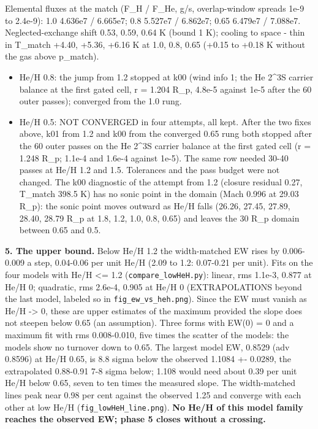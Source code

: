 \documentclass[english,a4paper]{my_memo}
\providecommand{\tightlist}{\setlength{\itemsep}{0pt}\setlength{\parskip}{0pt}}
\begin{document}
Elemental fluxes at the match (F\_H / F\_He, g/s, overlap-window spreads
1e-9 to 2.4e-9): 1.0 4.636e7 / 6.665e7; 0.8 5.527e7 / 6.862e7; 0.65
6.479e7 / 7.088e7. Neglected-exchange shift 0.53, 0.59, 0.64 K (bound 1 K);
cooling to space - thin in T\_match +4.40, +5.36, +6.16 K at 1.0, 0.8,
0.65 (+0.15 to +0.18 K without the gas above p\_match).

\begin{itemize}
\tightlist
\item
  He/H 0.8: the jump from 1.2 stopped at k00 (wind info 1; the He 2\^{}3S
  carrier balance at the first gated cell, r = 1.204 R\_p, 4.8e-5 against
  1e-5 after the 60 outer passes); converged from the 1.0 rung.
\item
  He/H 0.5: NOT CONVERGED in four attempts, all kept. After the two fixes
  above, k01 from 1.2 and k00 from the converged 0.65 rung both stopped
  after the 60 outer passes on the He 2\^{}3S carrier balance at the first
  gated cell (r = 1.248 R\_p; 1.1e-4 and 1.6e-4 against 1e-5). The same row
  needed 30-40 passes at He/H 1.2 and 1.5. Tolerances and the pass budget
  were not changed. The k00 diagnostic of the attempt from 1.2 (closure
  residual 0.27, T\_match 398.5 K) has no sonic point in the domain (Mach
  0.996 at 29.03 R\_p): the sonic point moves outward as He/H falls (26.26,
  27.45, 27.89, 28.40, 28.79 R\_p at 1.8, 1.2, 1.0, 0.8, 0.65) and leaves
  the 30 R\_p domain between 0.65 and 0.5.
\end{itemize}

\textbf{5. The upper bound.} Below He/H 1.2 the width-matched EW rises by
0.006-0.009 a step, 0.04-0.06 per unit He/H (2.09 to 1.2: 0.07-0.21 per
unit). Fits on the four models with He/H \textless= 1.2 (\texttt{compare\_lowHeH.py}):
linear, rms 1.1e-3, 0.877 at He/H 0; quadratic, rms 2.6e-4, 0.905 at He/H
0 (EXTRAPOLATIONS beyond the last model, labeled so in
\texttt{fig\_ew\_vs\_heh.png}). Since the EW must vanish as He/H -\textgreater{} 0, these are
upper estimates of the maximum provided the slope does not steepen below
0.65 (an assumption). Three forms with EW(0) = 0 and a maximum fit with rms
0.008-0.010, five times the scatter of the models: the models show no
turnover down to 0.65. The largest model EW, 0.8529 (adv 0.8596) at He/H
0.65, is 8.8 sigma below the observed 1.1084 +- 0.0289, the extrapolated
0.88-0.91 7-8 sigma below; 1.108 would need about 0.39 per unit He/H below
0.65, seven to ten times the measured slope. The width-matched lines peak
near 0.98 per cent against the observed 1.25 and converge with each other
at low He/H (\texttt{fig\_lowHeH\_line.png}). \textbf{No He/H of this model family
reaches the observed EW; phase 5 closes without a crossing.}
\end{document}
